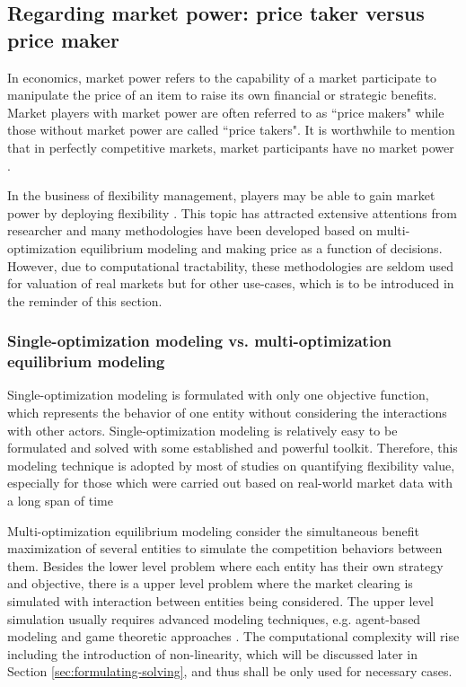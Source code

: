 \subsection{Regarding market power: price taker versus price maker}
In economics, market power refers to the capability of a market participate to manipulate the price of an item to raise its own financial or strategic benefits. Market players with market power are often referred to as ``price makers" while those without market power are called ``price takers". It is worthwhile to mention that in perfectly competitive markets, market participants have no market power \cite{Mankiw2011}. 

In the business of flexibility management, players may be able to gain market power by deploying flexibility \cite{Zucker2013,Schill2011,He2012}.
This topic has attracted extensive attentions from researcher and many methodologies have been developed based on multi-optimization equilibrium modeling and making price as a function of decisions. However, due to computational tractability, these methodologies are seldom used for valuation of real markets but for other use-cases, which is to be introduced in the reminder of this section.

\subsubsection{Single-optimization modeling vs. multi-optimization equilibrium modeling}
Single-optimization modeling is formulated with only one objective function, which represents the behavior of one entity without considering the  interactions with other actors. Single-optimization modeling is relatively easy to be formulated and solved with some established and powerful toolkit. Therefore, this modeling technique is adopted by most of studies on quantifying flexibility value, especially for those which were carried out based on real-world market data with a long span of time \cite{Walawalkar2007,Sioshansi2009,Byrne2012,Bradbury2014,McConnell2015,Berrada2016,Salles2017}

Multi-optimization equilibrium modeling consider the simultaneous benefit maximization of several entities to simulate the competition behaviors between them. Besides the lower level problem where each entity has their own strategy and objective, there is a upper level problem where the market clearing is simulated with interaction between entities being considered. The upper level simulation usually requires advanced modeling techniques, e.g. agent-based modeling \cite{Yousefi2011,Dallinger2012,Zheng2014} and game theoretic approaches \cite{Schill2011,Gkatzikis2013,Lin2014,Kardakos2013}. The computational complexity will rise including the introduction of non-linearity, which will be discussed later in Section \ref{sec:formulating-solving}, and thus shall be only used for necessary cases. 

